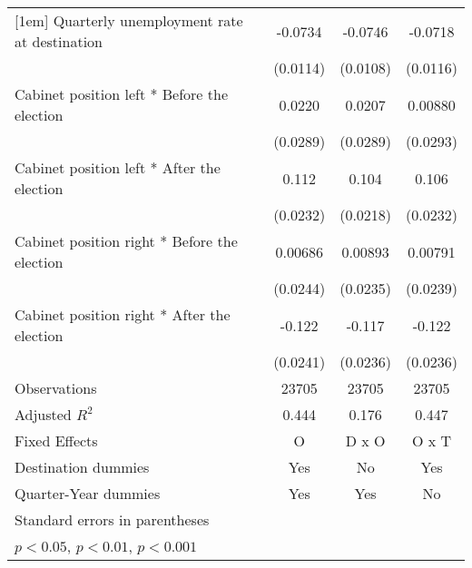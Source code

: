 \begin{table}[htbp]
\begin{tabular}{l*{3}{c}}
[1em]
Quarterly unemployment rate at destination&     -0.0734\sym{***}&     -0.0746\sym{***}&     -0.0718\sym{***}\\
                    &    (0.0114)         &    (0.0108)         &    (0.0116)         \\
[1em]
Cabinet position left * Before the election&      0.0220         &      0.0207         &     0.00880         \\
                    &    (0.0289)         &    (0.0289)         &    (0.0293)         \\
[1em]
Cabinet position left * After the election&       0.112\sym{***}&       0.104\sym{***}&       0.106\sym{***}\\
                    &    (0.0232)         &    (0.0218)         &    (0.0232)         \\
[1em]
Cabinet position right * Before the election&     0.00686         &     0.00893         &     0.00791         \\
                    &    (0.0244)         &    (0.0235)         &    (0.0239)         \\
[1em]
Cabinet position right * After the election&      -0.122\sym{***}&      -0.117\sym{***}&      -0.122\sym{***}\\
                    &    (0.0241)         &    (0.0236)         &    (0.0236)         \\
\hline
Observations        &       23705         &       23705         &       23705         \\
Adjusted \(R^{2}\)  &       0.444         &       0.176         &       0.447         \\
Fixed Effects       &           O         &       D x O         &       O x T         \\
Destination dummies &         Yes         &          No         &         Yes         \\
Quarter-Year dummies&         Yes         &         Yes         &          No         \\
\hline\hline
\multicolumn{4}{l}{\footnotesize Standard errors in parentheses}\\
\multicolumn{4}{l}{\footnotesize \sym{*} \(p<0.05\), \sym{**} \(p<0.01\), \sym{***} \(p<0.001\)}\\
\end{tabular}
\end{table}

